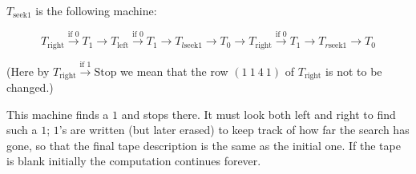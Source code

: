 $T_{\text{seek}1}$ is the following machine:

\[
T_{\text{right}} \xrightarrow{\text{if } 0} T_1 \rightarrow T_{\text{left}} \xrightarrow{\text{if } 0} T_1 \rightarrow T_{l\text{seek}1} \rightarrow T_0 \rightarrow T_{\text{right}} \xrightarrow{\text{if } 0} T_1 \rightarrow T_{r\text{seek}1} \rightarrow T_0
\]

(Here by $T_{\text{right}} \xrightarrow{\text{if } 1} \text{Stop}$ we mean that the row $(1 \ 1 \ 4 \ 1)$ of $T_{\text{right}}$ is not to be changed.)

This machine finds a $1$ and stops there. It must look both left and right to find such a $1$; $1$'s are written (but later erased) to keep track of how far the search has gone, so that the final tape description is the same as the initial one. If the tape is blank initially the computation continues forever.
